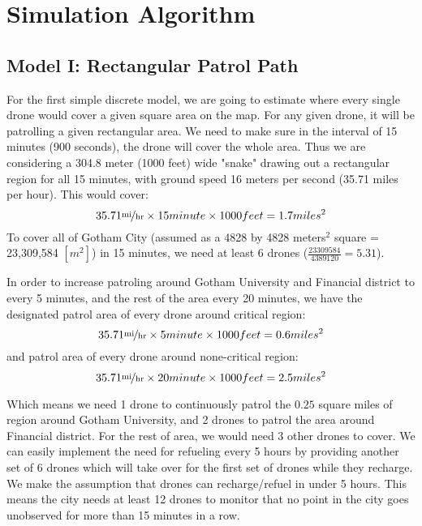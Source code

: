 \documentclass{article}
\begin{document}
\section {Simulation Algorithm}
\subsection {Model I: Rectangular Patrol Path}
For the first simple discrete model, we are going to estimate where every single drone would cover a given square area on the map. For any given drone, it will be patrolling a given rectangular area. We need to make sure in the interval of 15 minutes (900 seconds), the drone will cover the whole area. Thus we are considering a 304.8 meter (1000 feet) wide "snake" drawing out a rectangular region for all 15 minutes, with ground speed 16 meters per second (35.71 miles per hour). This would cover:
\begin{equation}
35.71 \unitfrac{mi}{hr} \times 15 minute \times 1000 feet = 1.7 miles^2
\end{equation}
To cover all of Gotham City (assumed as a 4828 by 4828 meters$^{2}$ square = 23,309,584 $[m^{2}]$) in 15 minutes, we need at least 6 drones ($\frac{23309584}{4389120} = 5.31$).  

In order to increase patroling around Gotham University and Financial district to every 5 minutes, and the rest of the area every 20 minutes, we have the designated patrol area of every drone around critical region:
\begin{equation}
35.71 \unitfrac{mi}{hr} \times 5 minute \times 1000 feet = 0.6 miles^2
\end{equation}
and patrol area of every drone around none-critical region:
\begin{equation}
35.71 \unitfrac{mi}{hr} \times 20 minute \times 1000 feet = 2.5 miles^2
\end{equation}

Which means we need 1 drone to continuously patrol the $0.25$ square miles of region around Gotham University, and 2 drones to patrol the area around Financial district. For the rest of area, we would need 3 other drones to cover. We can easily implement the need for refueling every 5 hours by providing another set of 6 drones which will take over for the first set of drones while they recharge. We make the assumption that drones can recharge/refuel in under 5 hours. This means the city needs at least 12 drones to monitor that no point in the city goes unobserved for more than 15 minutes in a row. 
\end{document}
